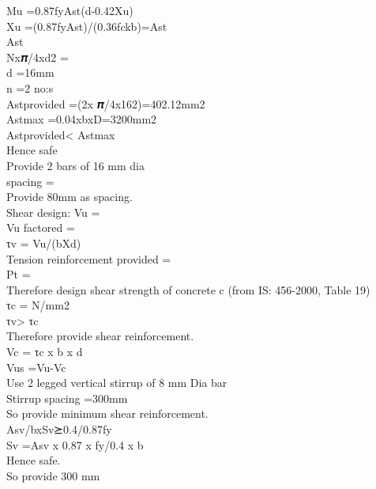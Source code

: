 Mu                                                 =0.87fyAst(d-0.42Xu)\\
Xu                                                 =(0.87fyAst)/(0.36fckb)=Ast\\
Ast  \\
Nx𝝅/4xd2  = \\
d                                                   =16mm\\
n                                     =2 no:s    \\               
Astprovided	                                  =(2x 𝝅/4x162)=402.12mm2\\
Astmax                                                       =0.04xbxD=3200mm2\\
Astprovided<  Astmax\\
Hence safe\\
Provide 2 bars of 16 mm dia \\
spacing                                                      =\\

Provide 80mm as spacing.\\
Shear design:
Vu						=\\
Vu factored                                     =\\
τv						= Vu/(bXd)\\

Tension reinforcement provided         = \\
Pt = \\
Therefore design shear strength of concrete c (from IS: 456-2000, Table 19)\\
τc						= N/mm2\\
τv> τc\\
Therefore provide shear reinforcement.\\
Vc						= τc x b x d \\
Vus						=Vu-Vc\\

Use 2 legged vertical stirrup of 8 mm Dia bar\\
Stirrup spacing                                  =300mm\\
So provide minimum shear reinforcement.\\
Asv/bxSv⪰0.4/0.87fy\\
Sv						 =Asv x 0.87 x fy/0.4 x b\\

Hence safe.\\
So provide 300 mm\\

